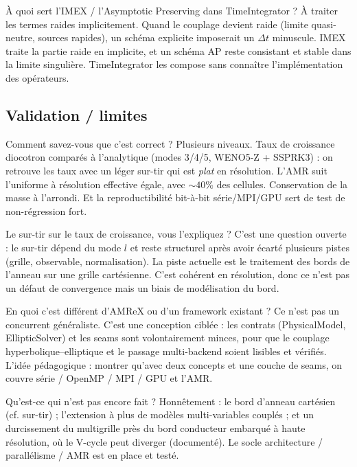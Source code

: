\documentclass[11pt]{article}
\begin{document}
\begin{qa}{À quoi sert l'IMEX / l'Asymptotic Preserving dans TimeIntegrator ?}
À traiter les termes raides implicitement. Quand le couplage devient raide (limite
quasi-neutre, sources rapides), un schéma explicite imposerait un $\Delta t$ minuscule.
IMEX traite la partie raide en implicite, et un schéma AP reste consistant et stable dans
la limite singulière. TimeIntegrator les compose sans connaître l'implémentation des
opérateurs.
\end{qa}

\subsection{Validation / limites}

\begin{qa}{Comment savez-vous que c'est correct ?}
Plusieurs niveaux. Taux de croissance diocotron comparés à l'analytique (modes 3/4/5,
WENO5-Z + SSPRK3) : on retrouve les taux avec un léger sur-tir qui est \emph{plat} en
résolution. L'AMR suit l'uniforme à résolution effective égale, avec $\sim 40\%$ des
cellules. Conservation de la masse à l'arrondi. Et la reproductibilité bit-à-bit
série/MPI/GPU sert de test de non-régression fort.
\end{qa}

\begin{qa}{Le sur-tir sur le taux de croissance, vous l'expliquez ?}
C'est une question ouverte : le sur-tir dépend du mode $l$ et reste structurel après avoir
écarté plusieurs pistes (grille, observable, normalisation). La piste actuelle est le
traitement des bords de l'anneau sur une grille cartésienne. C'est cohérent en résolution,
donc ce n'est pas un défaut de convergence mais un biais de modélisation du bord.
\end{qa}

\begin{qa}{En quoi c'est différent d'AMReX ou d'un framework existant ?}
Ce n'est pas un concurrent généraliste. C'est une conception ciblée : les contrats
(PhysicalModel, EllipticSolver) et les seams sont volontairement minces, pour que le
couplage hyperbolique–elliptique et le passage multi-backend soient lisibles et vérifiés.
L'idée pédagogique : montrer qu'avec deux concepts et une couche de seams, on couvre
série / OpenMP / MPI / GPU et l'AMR.
\end{qa}

\begin{qa}{Qu'est-ce qui n'est pas encore fait ?}
Honnêtement : le bord d'anneau cartésien (cf. sur-tir) ; l'extension à plus de modèles
multi-variables couplés ; et un durcissement du multigrille près du bord conducteur
embarqué à haute résolution, où le V-cycle peut diverger (documenté). Le socle
architecture / parallélisme / AMR est en place et testé.
\end{qa}
\end{document}
